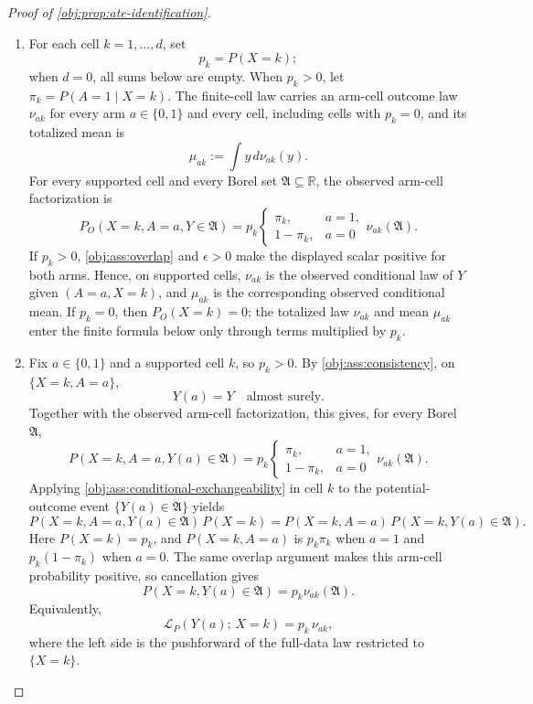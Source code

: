 \begin{proof}[Proof of \cref{obj:prop:ate-identification}]
\begin{enumerate}
\item
For each cell \(k=1,\ldots,d\), set
\[
p_k=P(X=k);
\]
when \(d=0\), all sums below are empty.  When \(p_k>0\), let \(\pi_k=P(A=1\mid X=k)\).  The finite-cell law carries an arm-cell outcome law \(\nu_{ak}\) for every arm \(a\in\{0,1\}\) and every cell, including cells with \(p_k=0\), and its totalized mean is
\[
\mu_{ak}:=\int y\,d\nu_{ak}(y).
\]
For every supported cell and every Borel set \(\mathfrak A\subseteq\mathbb R\), the observed arm-cell factorization is
\[
P_O(X=k,A=a,Y\in\mathfrak A)
=
p_k
\begin{cases}
\pi_k, & a=1,\\
1-\pi_k, & a=0
\end{cases}
\nu_{ak}(\mathfrak A).
\]
If \(p_k>0\), \cref{obj:ass:overlap} and \(\epsilon>0\) make the displayed scalar positive for both arms.  Hence, on supported cells, \(\nu_{ak}\) is the observed conditional law of \(Y\) given \((A=a,X=k)\), and \(\mu_{ak}\) is the corresponding observed conditional mean.  If \(p_k=0\), then \(P_O(X=k)=0\); the totalized law \(\nu_{ak}\) and mean \(\mu_{ak}\) enter the finite formula below only through terms multiplied by \(p_k\). %

\item
Fix \(a\in\{0,1\}\) and a supported cell \(k\), so \(p_k>0\).  By \cref{obj:ass:consistency}, on \(\{X=k,A=a\}\),
\[
Y(a)=Y
\quad\text{almost surely}.
\]
Together with the observed arm-cell factorization, this gives, for every Borel \(\mathfrak A\),
\[
P(X=k,A=a,Y(a)\in\mathfrak A)
=
p_k
\begin{cases}
\pi_k, & a=1,\\
1-\pi_k, & a=0
\end{cases}
\nu_{ak}(\mathfrak A).
\]
Applying \cref{obj:ass:conditional-exchangeability} in cell \(k\) to the potential-outcome event \(\{Y(a)\in\mathfrak A\}\) yields
\[
P(X=k,A=a,Y(a)\in\mathfrak A)\,P(X=k)
=
P(X=k,A=a)\,P(X=k,Y(a)\in\mathfrak A).
\]
Here \(P(X=k)=p_k\), and \(P(X=k,A=a)\) is \(p_k\pi_k\) when \(a=1\) and \(p_k(1-\pi_k)\) when \(a=0\).  The same overlap argument makes this arm-cell probability positive, so cancellation gives
\[
P(X=k,Y(a)\in\mathfrak A)=p_k\nu_{ak}(\mathfrak A).
\]
Equivalently,
\[
\mathcal L_P(Y(a);\,X=k)=p_k\,\nu_{ak},
\]
where the left side is the pushforward of the full-data law restricted to \(\{X=k\}\). %


\end{enumerate}
\end{proof}
